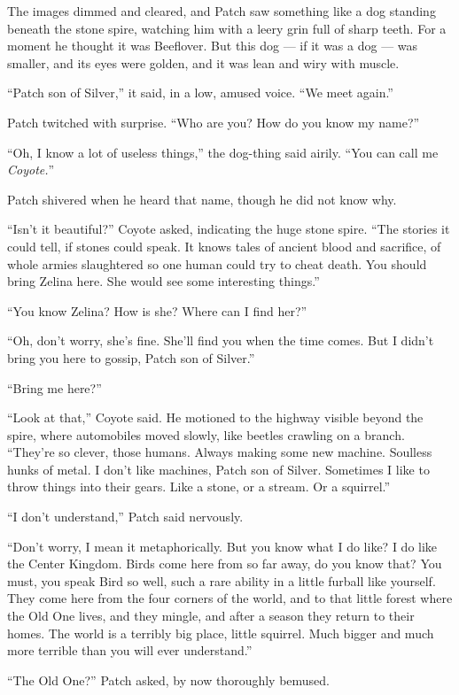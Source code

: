 \documentclass[ebook,oneside,openany,17pt]{memoir}
\begin{document}
The images dimmed and cleared, and Patch saw something like a dog
standing beneath the stone spire, watching him with a leery grin full
of sharp teeth. For a moment he thought it was Beeflover. But this dog
— if it was a dog — was smaller, and its eyes were golden, and it was
lean and wiry with muscle.

“Patch son of Silver,” it said, in a low, amused voice. “We meet
again.”

Patch twitched with surprise. “Who are you? How do you know my name?”

“Oh, I know a lot of useless things,” the dog-thing said airily. “You
can call me \emph{Coyote.}”

Patch shivered when he heard that name, though he did not know why.

“Isn’t it beautiful?” Coyote asked, indicating the huge stone
spire. “The stories it could tell, if stones could speak. It knows
tales of ancient blood and sacrifice, of whole armies slaughtered so
one human could try to cheat death. You should bring Zelina here. She
would see some interesting things.”

“You know Zelina? How is she? Where can I find her?”

“Oh, don’t worry, she’s fine. She’ll find you when the time comes. But
I didn’t bring you here to gossip, Patch son of Silver.”

“Bring me here?”

“Look at that,” Coyote said. He motioned to the highway visible beyond
the spire, where automobiles moved slowly, like beetles crawling on a
branch. “They’re so clever, those humans. Always making some new
machine. Soulless hunks of metal. I don’t like machines, Patch son of
Silver. Sometimes I like to throw things into their gears. Like a
stone, or a stream. Or a squirrel.”

“I don’t understand,” Patch said nervously.

“Don’t worry, I mean it metaphorically. But you know what I do like?
I do like the Center Kingdom. Birds come here from so far away, do you
know that? You must, you speak Bird so well, such a rare ability in a
little furball like yourself. They come here from the four corners of
the world, and to that little forest where the Old One lives, and they
mingle, and after a season they return to their homes. The world is a
terribly big place, little squirrel. Much bigger and much more
terrible than you will ever understand.”

“The Old One?” Patch asked, by now thoroughly bemused.
\end{document}
